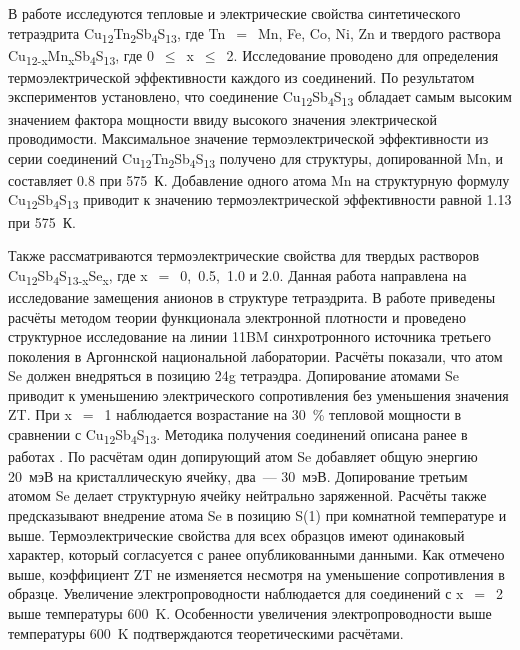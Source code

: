 В работе \cite{Heo2014} исследуются тепловые и электрические свойства синтетического тетраэдрита Cu\textsubscript{12}Tn\textsubscript{2}Sb\textsubscript{4}S\textsubscript{13}, где Tn~$=$~Mn, Fe, Co, Ni, Zn и твердого раствора Cu\textsubscript{12-x}Mn\textsubscript{x}Sb\textsubscript{4}S\textsubscript{13}, где 0~$\leq$~x~$\leq$~2. Исследование проводено для определения термоэлектрической эффективности каждого из соединений. По результатом экспериментов установлено, что соединение Cu\textsubscript{12}Sb\textsubscript{4}S\textsubscript{13} обладает самым высоким значением фактора мощности ввиду высокого значения электрической проводимости. Максимальное значение термоэлектрической эффективности из серии соединений Cu\textsubscript{12}Tn\textsubscript{2}Sb\textsubscript{4}S\textsubscript{13} получено для структуры, допированной Mn, и составляет 0.8 при 575~К. Добавление одного атома  Mn на структурную формулу Cu\textsubscript{12}Sb\textsubscript{4}S\textsubscript{13} приводит к значению термоэлектрической эффективности равной 1.13 при 575~К.

Также рассматриваются термоэлектрические свойства для твердых растворов Cu\textsubscript{12}Sb\textsubscript{4}S\textsubscript{13-x}Se\textsubscript{x}, где x~$=$~0,~0.5,~1.0 и 2.0\cite{Lu2016}.
Данная работа направлена на исследование замещения анионов в структуре тетраэдрита.
В работе приведены расчёты методом теории функционала электронной плотности и проведено структурное исследование на линии 11BM  синхротронного источника третьего поколения в Аргоннской национальной лаборатории.
Расчёты показали, что атом Se должен внедряться в позицию 24g тетраэдра.
Допирование атомами Se приводит к уменьшению электрического сопротивления без уменьшения значения ZT.
При x~$=$~1 наблюдается возрастание на 30~\% тепловой мощности в сравнении с Cu\textsubscript{12}Sb\textsubscript{4}S\textsubscript{13}.
Методика получения соединений описана ранее в работах \cite{Lu2013,Lu_2013b,Lu_2013}. По расчётам один допирующий атом Se  добавляет общую энергию 20~мэВ на кристаллическую ячейку, два~--- 30~мэВ.
Допирование третьим атомом Se делает структурную ячейку нейтрально заряженной. Расчёты также предсказывают внедрение атома Se в позицию S(1) при комнатной температуре и выше.
Термоэлектрические свойства для всех образцов имеют одинаковый характер, который согласуется с ранее опубликованными данными.
Как отмечено выше, коэффициент ZT не изменяется несмотря на уменьшение сопротивления в образце.
Увеличение электропроводности наблюдается для соединений с  x~$=$~2 выше температуры 600~K. Особенности увеличения электропроводности выше температуры 600~K подтверждаются теоретическими расчётами.

